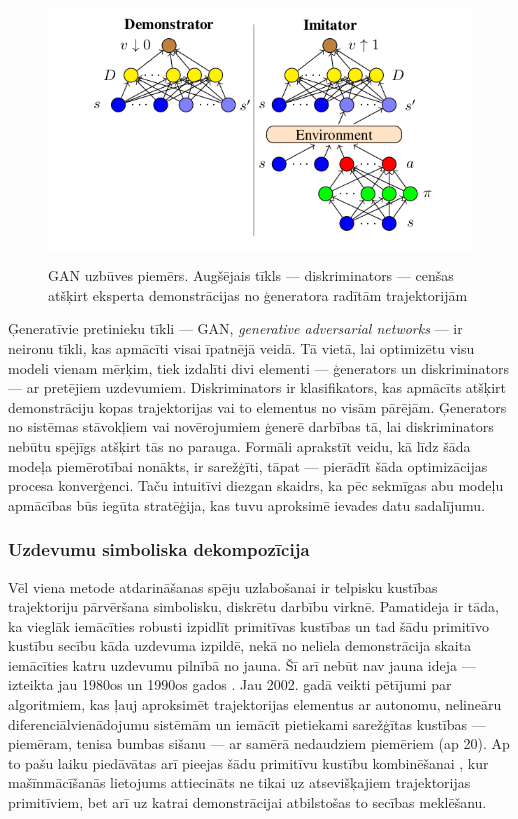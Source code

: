 \documentclass[12pt, a4paper]{article}
\numberwithin{equation}{section} %
\begin{document}
\begin{figure}[t!]
    \centering
    \includegraphics[height=7cm,page=1]{../img/GAN.png}
    \caption{GAN uzbūves piemērs. Augšējais tīkls --- diskriminators --- cenšas atšķirt eksperta demonstrācijas no ģeneratora radītām trajektorijām \cite{torabi2018generative}}
\end{figure}

Ģeneratīvie pretinieku tīkli --- GAN, \textit{generative adversarial networks} --- ir neironu tīkli, kas apmācīti visai īpatnējā veidā. Tā vietā, lai optimizētu visu modeli vienam mērķim, tiek izdalīti divi elementi --- ģenerators un diskriminators --- ar pretējiem uzdevumiem. Diskriminators ir klasifikators, kas apmācīts atšķirt demonstrāciju kopas trajektorijas vai to elementus no visām pārējām. Ģenerators no sistēmas stāvokļiem vai novērojumiem ģenerē darbības tā, lai diskriminators nebūtu spējīgs atšķirt tās no parauga. Formāli aprakstīt veidu, kā līdz šāda modeļa piemērotībai nonākts, ir sarežģīti, tāpat --- pierādīt šāda optimizācijas procesa konverģenci. Taču intuitīvi diezgan skaidrs, ka pēc sekmīgas abu modeļu apmācības būs iegūta stratēģija, kas tuvu aproksimē ievades datu sadalījumu.

\subsubsection{Uzdevumu simboliska dekompozīcija}

Vēl viena metode atdarināšanas spēju uzlabošanai ir telpisku kustības trajektoriju pārvēršana simbolisku, diskrētu darbību virknē. Pamatideja ir tāda, ka vieglāk iemācīties robusti izpidlīt primitīvas kustības un tad šādu primitīvo kustību secību kāda uzdevuma izpildē, nekā no neliela demonstrācija skaita iemācīties katru uzdevumu pilnībā no jauna. Šī arī nebūt nav jauna ideja --- izteikta jau 1980os un 1990os gados \cite{muench1994robot}. Jau 2002. gadā veikti pētījumi par algoritmiem, kas ļauj aproksimēt trajektorijas elementus ar autonomu, nelineāru diferenciālvienādojumu sistēmām \cite{ijspeert2002movement} un iemācīt pietiekami sarežģītas kustības --- piemēram, tenisa bumbas sišanu --- ar samērā nedaudziem piemēriem (ap 20). Ap to pašu laiku piedāvātas arī pieejas šādu primitīvu kustību kombinēšanai \cite{schaal2003computational}, kur mašīnmācīšanās lietojums attiecināts ne tikai uz atsevišķajiem trajektorijas primitīviem, bet arī uz katrai demonstrācijai atbilstošas to secības meklēšanu.
\end{document}
